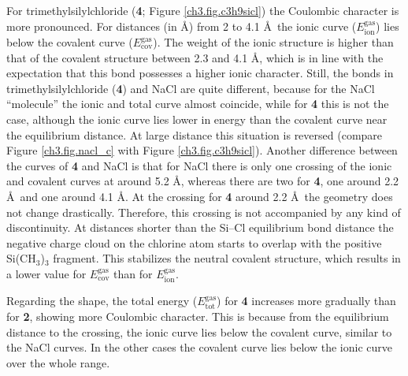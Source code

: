 For trimethylsilylchloride (\textbf{4}; Figure \ref{ch3.fig.c3h9sicl}) the Coulombic character is more pronounced. For distances (in \AA) from 2 to 4.1 \AA\  the ionic curve ($E_\mathrm{ion}^\mathrm{gas}$) lies below the covalent curve ($E_\mathrm{cov}^\mathrm{gas}$). The weight of the ionic structure is higher than that of the covalent structure between 2.3 and 4.1 \AA, which is in line with the expectation that this bond possesses a higher ionic character. Still, the bonds in trimethylsilylchloride (\textbf{4}) and NaCl are quite different, because for the NaCl ``molecule'' the ionic and total curve almost coincide, while for \textbf{4} this is not the case, although the ionic curve lies lower in energy than the covalent curve near the equilibrium distance. At large distance this situation is reversed (compare Figure \ref{ch3.fig.nacl_c} with Figure \ref{ch3.fig.c3h9sicl}). Another difference between the curves of \textbf{4} and NaCl is that for NaCl there is only one crossing of the ionic and covalent curves at around 5.2 \AA, whereas there are two for \textbf{4}, one around 2.2 \AA\ and one around 4.1 \AA. At the crossing for \textbf{4} around 2.2 \AA\ the geometry does not change drastically. Therefore, this crossing is not accompanied by any kind of discontinuity. At distances shorter than the Si--Cl equilibrium bond distance the negative charge cloud on the chlorine atom starts to overlap with the positive Si(CH$_3$)$_3$ fragment. This stabilizes the neutral covalent structure, which results in a lower value for $E_\mathrm{cov}^\mathrm{gas}$ than for $E_\mathrm{ion}^\mathrm{gas}$. 

Regarding the shape, the total energy ($E_\mathrm{tot}^\mathrm{gas}$) for \textbf{4} increases more gradually than for \textbf{2}, showing more Coulombic character. This is because from the equilibrium distance to the crossing, the ionic curve lies below the covalent curve, similar to the NaCl curves. In the other cases the covalent curve lies below the ionic curve over the whole range.

